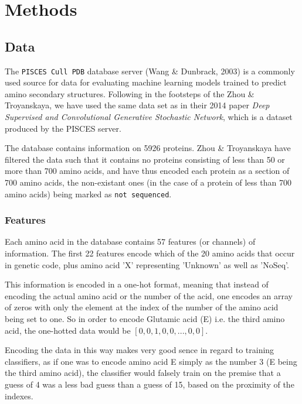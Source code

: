 \section{Methods}

\subsection{Data}
The \texttt{PISCES Cull PDB} database server (Wang \& Dunbrack, 2003) is a commonly used source for data for evaluating 
machine learning models trained to predict amino secondary structures. Following in the footsteps of the Zhou \& 
Troyanskaya, we have used the same data set as in their 2014 paper \textit{Deep Supervised and Convolutional Generative 
Stochastic Network}, which is a dataset produced by the PISCES server.

The database contains information on 5926 proteins. Zhou \& Troyanskaya have filtered the data such that it contains no proteins consisting of less than 50 or more than 700 amino acids, and have thus encoded each protein as a section of 700 amino acids, the non-existant ones (in the case of a protein of less than 700 amino acids) being marked as \texttt{not sequenced}.

\subsubsection{Features}
Each amino acid in the database contains 57 features (or channels) of information. The first 22 features encode which of the 20 amino acids that occur in genetic code, plus amino acid 'X' representing 'Unknown' as well as 'NoSeq'.

This information is encoded in a one-hot format, meaning that instead of encoding the actual amino acid or the number of the acid, one encodes an array of zeros with only the element at the index of the number of the amino acid being set to one. So in order to encode Glutamic acid (E) i.e. the third amino acid, the one-hotted data would be $[0, 0, 1, 0, 0, ... , 0, 0]$. 

Encoding the data in this way makes very good sence in regard to training classifiers, as if one was to encode amino acid E simply as the number 3 (E being the third amino acid), the classifier would falsely train on the premise that a guess of 4 was a less bad guess than a guess of 15, based on the proximity of the indexes.

